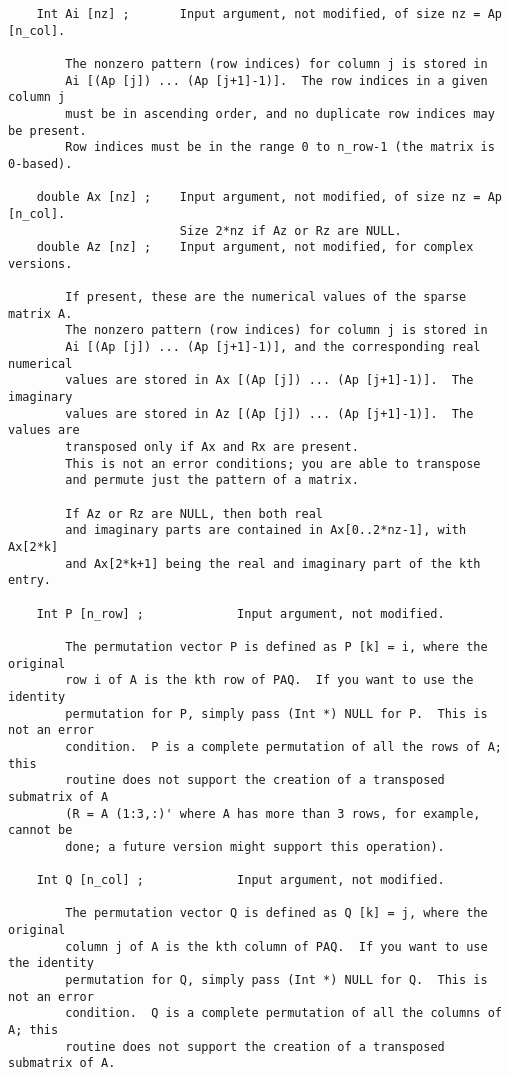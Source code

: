 \documentclass[11pt]{article}
\begin{document}
{\begin{verbatim}
    Int Ai [nz] ;       Input argument, not modified, of size nz = Ap [n_col].

        The nonzero pattern (row indices) for column j is stored in
        Ai [(Ap [j]) ... (Ap [j+1]-1)].  The row indices in a given column j
        must be in ascending order, and no duplicate row indices may be present.
        Row indices must be in the range 0 to n_row-1 (the matrix is 0-based).

    double Ax [nz] ;    Input argument, not modified, of size nz = Ap [n_col].
                        Size 2*nz if Az or Rz are NULL.
    double Az [nz] ;    Input argument, not modified, for complex versions.

        If present, these are the numerical values of the sparse matrix A.
        The nonzero pattern (row indices) for column j is stored in
        Ai [(Ap [j]) ... (Ap [j+1]-1)], and the corresponding real numerical
        values are stored in Ax [(Ap [j]) ... (Ap [j+1]-1)].  The imaginary
        values are stored in Az [(Ap [j]) ... (Ap [j+1]-1)].  The values are
        transposed only if Ax and Rx are present.
        This is not an error conditions; you are able to transpose
        and permute just the pattern of a matrix.

        If Az or Rz are NULL, then both real
        and imaginary parts are contained in Ax[0..2*nz-1], with Ax[2*k]
        and Ax[2*k+1] being the real and imaginary part of the kth entry.

    Int P [n_row] ;             Input argument, not modified.

        The permutation vector P is defined as P [k] = i, where the original
        row i of A is the kth row of PAQ.  If you want to use the identity
        permutation for P, simply pass (Int *) NULL for P.  This is not an error
        condition.  P is a complete permutation of all the rows of A; this
        routine does not support the creation of a transposed submatrix of A
        (R = A (1:3,:)' where A has more than 3 rows, for example, cannot be
        done; a future version might support this operation).

    Int Q [n_col] ;             Input argument, not modified.

        The permutation vector Q is defined as Q [k] = j, where the original
        column j of A is the kth column of PAQ.  If you want to use the identity
        permutation for Q, simply pass (Int *) NULL for Q.  This is not an error
        condition.  Q is a complete permutation of all the columns of A; this
        routine does not support the creation of a transposed submatrix of A.


\end{verbatim}}
\end{document}
